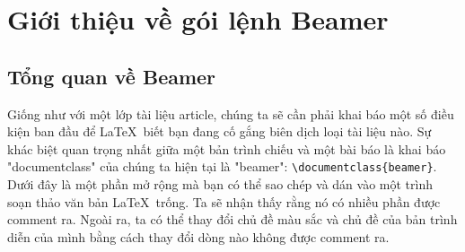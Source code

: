 \documentclass[a4paper,UKenglish,cleveref, autoref, thm-restate]{lipics-v2021}
\begin{document}
\section{Giới thiệu về gói lệnh Beamer}
\label{sec:beamer-summary}

\subsection{Tổng quan về Beamer} 

Giống như với một lớp tài liệu article, chúng ta sẽ cần phải khai báo một số điều kiện ban đầu để \LaTeX\ biết bạn đang cố gắng biên dịch loại tài liệu nào. Sự khác biệt quan trọng nhất giữa một bản trình chiếu và một bài báo là khai báo "documentclass" của chúng ta hiện tại là "beamer": \verb|\documentclass{beamer}|. Dưới đây là một phần mở rộng mà bạn có thể sao chép và dán vào một trình soạn thảo văn bản \LaTeX\ trống. Ta sẽ nhận thấy rằng nó có nhiều phần được comment ra. Ngoài ra, ta có thể thay đổi chủ đề màu sắc và chủ đề của bản trình diễn của mình bằng cách thay đổi dòng nào không được comment ra.
\end{document}
